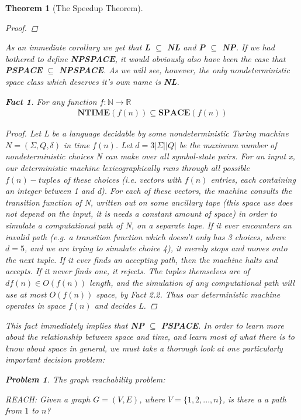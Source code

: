 \documentclass{article}
\theoremstyle{definition}
\newtheorem{problem}{Problem}
\theoremstyle{plain}
\theoremstyle{theorem}
\newtheorem{fact}{Fact}[section]
\newtheorem{theorem}{Theorem}[section]
\begin{document}
\begin{theorem}[The Speedup Theorem]
\begin{proof}
\end{proof}
As an immediate corollary we get that \textbf{L} $\subseteq$ \textbf{NL} and \textbf{P} $\subseteq$ \textbf{NP}. If we had bothered to define \textbf{NPSPACE}, it would obviously also have been the case that \textbf{PSPACE} $\subseteq$ \textbf{NPSPACE}. As we will see, however, the only nondeterministic space class which deserves it's own name is \textbf{NL}. 
\begin{fact}
For any function $f:\mathbb{N} \to \mathbb{R}$
\begin{align}
\textbf{NTIME$(f(n))$} \subseteq \textbf{SPACE$(f(n))$}
\end{align}
\end{fact}
\begin{proof}
Let L be a language decidable by some nondeterministic Turing machine $N=(\Sigma,Q,\delta)$ in time $f(n)$. Let $d=3|\Sigma||Q|$ be the maximum number of nondeterministic choices N can make over all symbol-state pairs. For an input x, our deterministic machine lexicographically runs through all possible $f(n)-tuples$ of these choices (i.e. vectors with $f(n)$ entries, each containing an integer between 1 and d). For each of these vectors, the machine consults the transition function of N, written out on some ancillary tape (this space use does not depend on the input, it is needs a constant amount of space) in order to simulate a computational path of N, on a separate tape. If it ever encounters an invalid path (e.g. a transition function which doesn't only has 3 choices, where $d=5$, and we are trying to simulate choice 4), it merely stops and moves onto the next tuple. If it ever finds an accepting path, then the machine halts and accepts. If it never finds one, it rejects. The tuples themselves are of $df(n) \in O(f(n))$ length, and the simulation of any computational path will use at most $O(f(n))$ space, by Fact 2.2. Thus our deterministic machine operates in space $f(n)$ and decides L.
\end{proof}
\par This fact immediately implies that \textbf{NP} $\subseteq$ \textbf{PSPACE}. 
In order to learn more about the relationship between space and time, and learn most of what there is to know about space in general, we must take a thorough look at one particularly important decision problem:
\begin{problem} The graph reachability problem:
\begin{center}
REACH: Given a graph $G=(V,E)$, where $V=\{1,2,...,n\}$, is there a a path from $1$ to $n$?

\end{center}
\end{problem}
\end{theorem}
\end{document}
